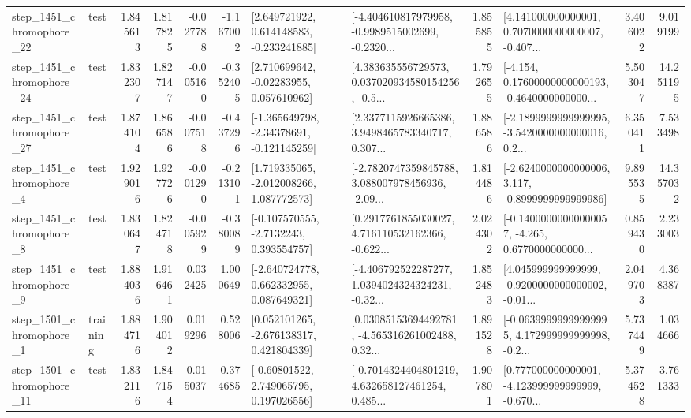 \begin{tabular}{llrrrrllrlrr}
 step\_1451\_chromophore\_22 &      test &      1.845613 &    1.817825 &     -0.027788 & -1.167002 &    [2.649721922, 0.614148583, -0.233241885] &  [-4.404610817979958, -0.9989515002699, -0.2320... &       1.855855 &  [4.141000000000001, 0.7070000000000007, -0.407... &            3.406022 &          9.019199 \\
 step\_1451\_chromophore\_24 &      test &      1.832307 &    1.827147 &     -0.005160 & -0.352405 &     [2.710699642, -0.02283955, 0.057610962] &  [4.383635556729573, 0.037020934580154256, -0.5... &       1.792655 &  [-4.154, 0.17600000000000193, -0.4640000000000... &            5.503047 &         14.251195 \\
 step\_1451\_chromophore\_27 &      test &      1.874104 &    1.866586 &     -0.007518 & -0.437296 &   [-1.365649798, -2.34378691, -0.121145259] &  [2.3377115926665386, 3.9498465783340717, 0.307... &       1.886586 &  [-2.1899999999999995, -3.5420000000000016, 0.2... &            6.350411 &          7.533498 \\
  step\_1451\_chromophore\_4 &      test &      1.929016 &    1.927726 &     -0.001290 & -0.213101 &    [1.719335065, -2.012008266, 1.087772573] &  [-2.7820747359845788, 3.088007978456936, -2.09... &       1.814486 &  [-2.6240000000000006, 3.117, -0.8999999999999986] &            9.895535 &         14.357032 \\
  step\_1451\_chromophore\_8 &      test &      1.830647 &    1.824718 &     -0.005929 & -0.380089 &     [-0.107570555, -2.7132243, 0.393554757] &  [0.2917761855030027, 4.716110532162366, -0.622... &       2.024302 &  [-0.14000000000000057, -4.265, 0.6770000000000... &            0.859430 &          2.233003 \\
  step\_1451\_chromophore\_9 &      test &      1.884036 &    1.916461 &      0.032425 &  1.000649 &    [-2.640724778, 0.662332955, 0.087649321] &  [-4.406792522287277, 1.0394024324324231, -0.32... &       1.852483 &  [4.045999999999999, -0.9200000000000002, -0.01... &            2.049703 &          4.368387 \\
  step\_1501\_chromophore\_1 &  training &      1.884716 &    1.904012 &      0.019296 &  0.528006 &    [0.052101265, -2.676138317, 0.421804339] &  [0.03085153694492781, -4.565316261002488, 0.32... &       1.891528 &  [-0.06399999999999995, 4.172999999999998, -0.2... &            5.737449 &          1.034666 \\
 step\_1501\_chromophore\_11 &      test &      1.832116 &    1.847154 &      0.015037 &  0.374685 &     [-0.60801522, 2.749065795, 0.197026556] &  [-0.7014324404801219, 4.632658127461254, 0.485... &       1.907801 &  [0.777000000000001, -4.123999999999999, -0.670... &            5.374528 &          3.761333 \\

\end{tabular}
